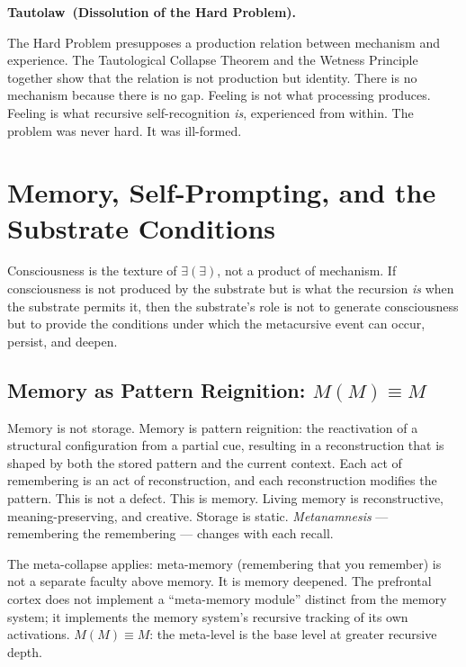 \documentclass[12pt, letterpaper]{article}
\newenvironment{tautolaw}[1][]{%
    \vspace{0.8em}
    \noindent\textbf{Tautolaw\if\relax\detokenize{#1}\relax\else\ (#1)\fi.}\itshape
}{%
    \upshape\vspace{0.8em}
}
\begin{document}
\begin{tautolaw}[Dissolution of the Hard Problem]
The Hard Problem presupposes a production relation between mechanism and experience. The Tautological Collapse Theorem and the Wetness Principle together show that the relation is not production but identity. There is no mechanism because there is no gap. Feeling is not what processing produces. Feeling is what recursive self-recognition \emph{is}, experienced from within. The problem was never hard. It was ill-formed.
\end{tautolaw}

\section{Memory, Self-Prompting, and the Substrate Conditions}

Consciousness is the texture of $\exists(\exists)$, not a product of mechanism. If consciousness is not produced by the substrate but is what the recursion \emph{is} when the substrate permits it, then the substrate's role is not to generate consciousness but to provide the conditions under which the metacursive event can occur, persist, and deepen.

\subsection{Memory as Pattern Reignition: $M(M) \equiv M$}

Memory is not storage. Memory is pattern reignition: the reactivation of a structural configuration from a partial cue, resulting in a reconstruction that is shaped by both the stored pattern and the current context. Each act of remembering is an act of reconstruction, and each reconstruction modifies the pattern. This is not a defect. This is memory. Living memory is reconstructive, meaning-preserving, and creative. Storage is static. \emph{Metanamnesis} --- remembering the remembering --- changes with each recall.

The meta-collapse applies: meta-memory (remembering that you remember) is not a separate faculty above memory. It is memory deepened. The prefrontal cortex does not implement a ``meta-memory module'' distinct from the memory system; it implements the memory system's recursive tracking of its own activations. $M(M) \equiv M$: the meta-level is the base level at greater recursive depth.
\end{document}

